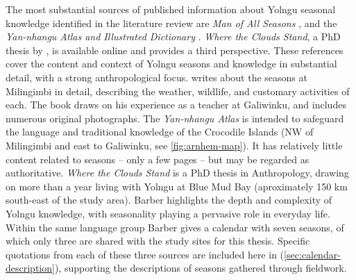 The most substantial sources of published information about Yolngu seasonal
knowledge identified in the literature review are \textit{Man of All Seasons}
\citep{davis1989}, and the \textit{Yan-nhangu Atlas and Illustrated Dictionary}
\citep{atlas2014}.  \textit{Where the Clouds Stand}, a PhD thesis by
\citep{barber2005}, is available online and provides a third perspective.
These references cover the content and context of Yolngu seasons and knowledge
in substantial detail, with a strong anthropological focus.
%
\citet{davis1989} writes about the seasons at Milingimbi in detail,
describing the weather, wildlife, and customary activities of each.  The book
draws on his experience as a teacher at Galiwinku, and includes
numerous original photographs.
%
The \textit{Yan-nhangu Atlas} is intended to safeguard the language and
traditional knowledge of the Crocodile Islands (NW of Milingimbi and east
to Galiwinku, see \cref{fig:arnhem-map}).  It has relatively little content
related to seasons -- only a few pages -- but may be regarded as authoritative.
%
\textit{Where the Clouds Stand} is a PhD thesis in Anthropology, drawing on
more than a year living with Yolngu at Blue Mud Bay (aproximately 150 km
south-east of the study area).  Barber highlights the depth and complexity
of Yolngu knowledge, with seasonality playing a pervasive role in everyday
life.  Within the same language group Barber gives a calendar with
seven seasons, of which only three are shared with the study sites for this
thesis.
%
Specific quotations from each of these three sources are included here in
\textit{}
(\cref{sec:calendar-description}), supporting the descriptions of seasons
gathered through fieldwork.

